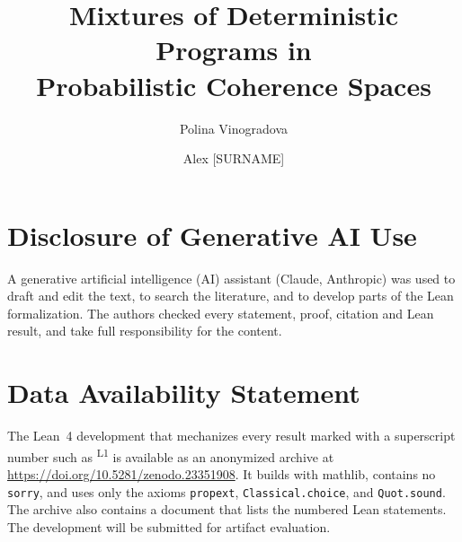 \documentclass[runningheads]{llncs}
\newif\ifanonymous
\begin{document}
\title{Mixtures of Deterministic Programs in\\ Probabilistic Coherence Spaces}

\ifanonymous
\author{Anonymous Author(s)}
\authorrunning{Anonymous}
\institute{Anonymous Institution}
\else
\author{Polina Vinogradova \and Alex [SURNAME]}
\institute{[AFFILIATION 1] \and [AFFILIATION 2]}
\fi

\maketitle














\section*{Disclosure of Generative AI Use}
A generative artificial intelligence (AI) assistant (Claude, Anthropic) was used to draft and edit
the text, to search the literature, and to develop parts of the Lean
formalization. The authors checked every statement, proof, citation and
Lean result, and take full responsibility for the content.

\section*{Data Availability Statement}
The Lean~4 development that mechanizes every result marked with a
superscript number such as \textsuperscript{\textsf{\scriptsize L1}} is
available as an anonymized archive at
\url{https://doi.org/10.5281/zenodo.23351908}. It builds with
\textsf{mathlib}, contains no \texttt{sorry}, and uses only the axioms
\texttt{propext}, \texttt{Classical.choice}, and \texttt{Quot.sound}. The
archive also contains a document that lists the numbered Lean statements.
The development will be submitted for artifact evaluation.



\end{document}
